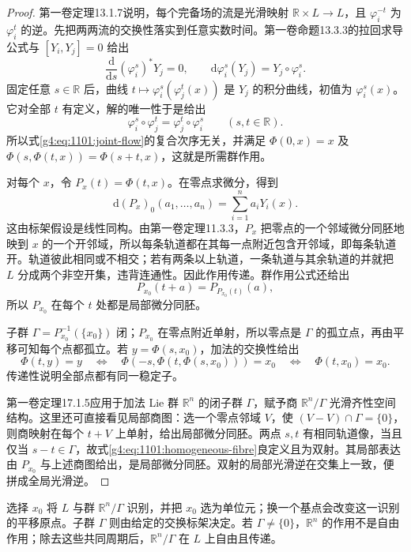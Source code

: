 \begin{proof}
	第一卷定理13.1.7说明，每个完备场的流是光滑映射 \(\mathbb R\times L\to L\)，且 \(\varphi_i^{-t}\) 为 \(\varphi_i^t\) 的逆。先把两两流的交换性落实到任意实数时间。第一卷命题13.3.3的拉回求导公式与 \([Y_i,Y_j]=0\) 给出
	\[
		\frac{\mathrm{d}}{\mathrm{d}s}(\varphi_i^s)^*Y_j=0,
		\qquad
		\mathrm{d}\varphi_i^s(Y_j)=Y_j\circ\varphi_i^s.
	\]
	固定任意 \(s\in\mathbb R\) 后，曲线 \(t\mapsto\varphi_i^s(\varphi_j^t(x))\) 是 \(Y_j\) 的积分曲线，初值为 \(\varphi_i^s(x)\)。它对全部 \(t\) 有定义，解的唯一性于是给出
	\[
		\varphi_i^s\circ\varphi_j^t
		=\varphi_j^t\circ\varphi_i^s
		\qquad(s,t\in\mathbb R).
	\]
	所以式\eqref{g4:eq:1101:joint-flow}的复合次序无关，并满足 \(\Phi(0,x)=x\) 及 \(\Phi(s,\Phi(t,x))=\Phi(s+t,x)\)，这就是所需群作用。

	对每个 \(x\)，令 \(P_x(t)=\Phi(t,x)\)。在零点求微分，得到
	\begin{equation}\label{g4:eq:1101:orbit-differential}
		\mathrm{d}(P_x)_0(a_1,\ldots,a_n)
		=\sum_{i=1}^n a_iY_i(x).
	\end{equation}
	这由标架假设是线性同构。由第一卷定理11.3.3，\(P_x\) 把零点的一个邻域微分同胚地映到 \(x\) 的一个开邻域，所以每条轨道都在其每一点附近包含开邻域，即每条轨道开。轨道彼此相同或不相交；若有两条以上轨道，一条轨道与其余轨道的并就把 \(L\) 分成两个非空开集，违背连通性。因此作用传递。群作用公式还给出
	\[
		P_{x_0}(t+a)=P_{P_{x_0}(t)}(a),
	\]
	所以 \(P_{x_0}\) 在每个 \(t\) 处都是局部微分同胚。

	子群 \(\Gamma=P_{x_0}^{-1}(\{x_0\})\) 闭；\(P_{x_0}\) 在零点附近单射，所以零点是 \(\Gamma\) 的孤立点，再由平移可知每个点都孤立。若 \(y=\Phi(s,x_0)\)，加法的交换性给出
	\[
		\Phi(t,y)=y
		\quad\Longleftrightarrow\quad
		\Phi(-s,\Phi(t,\Phi(s,x_0)))=x_0
		\quad\Longleftrightarrow\quad
		\Phi(t,x_0)=x_0.
	\]
	传递性说明全部点都有同一稳定子。

	第一卷定理17.1.5应用于加法 Lie 群 \(\mathbb R^n\) 的闭子群 \(\Gamma\)，赋予商 \(\mathbb R^n/\Gamma\) 光滑齐性空间结构。这里还可直接看见局部商图：选一个零点邻域 \(V\)，使 \((V-V)\cap\Gamma=\{0\}\)，则商映射在每个 \(t+V\) 上单射，给出局部微分同胚。两点 \(s,t\) 有相同轨道像，当且仅当 \(s-t\in\Gamma\)，故式\eqref{g4:eq:1101:homogeneous-fibre}良定义且为双射。其局部表达由 \(P_{x_0}\) 与上述商图给出，是局部微分同胚。双射的局部光滑逆在交集上一致，便拼成全局光滑逆。
\end{proof}

选择 \(x_0\) 将 \(L\) 与群 \(\mathbb R^n/\Gamma\) 识别，并把 \(x_0\) 选为单位元；换一个基点会改变这一识别的平移原点。子群 \(\Gamma\) 则由给定的交换标架决定。若 \(\Gamma\neq\{0\}\)，\(\mathbb R^n\) 的作用不是自由作用；除去这些共同周期后，\(\mathbb R^n/\Gamma\) 在 \(L\) 上自由且传递。


